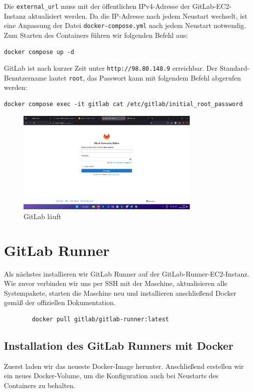 \documentclass[a4paper,12pt]{article}
\begin{document}
Die \texttt{external\_url} muss mit der öffentlichen IPv4-Adresse der GitLab-EC2-Instanz aktualisiert werden. Da die IP-Adresse nach jedem Neustart wechselt, ist eine Anpassung der Datei \texttt{docker-compose.yml} nach jedem Neustart notwendig.
Zum Starten des Containers führen wir folgenden Befehl aus:

\begin{verbatim}
docker compose up -d
\end{verbatim}

GitLab ist nach kurzer Zeit unter \texttt{http://98.80.148.9} erreichbar. Der Standard-Benutzername lautet \texttt{root}, das Passwort kann mit folgendem Befehl abgerufen werden:

\begin{verbatim}
docker compose exec -it gitlab cat /etc/gitlab/initial_root_password
\end{verbatim}

\begin{figure}[H]
	\centering
	\includegraphics[width=0.8\textwidth]{data/GITLAB_GEHT.png}
	\caption{GitLab läuft}
	\label{fig:GitLab läuft}
\end{figure}

\newpage


\section{GitLab Runner}
Als nächstes installieren wir GitLab Runner auf der GitLab-Runner-EC2-Instanz.  
Wie zuvor verbinden wir uns per SSH mit der Maschine, aktualisieren alle Systempakete, starten die Maschine neu und installieren anschließend Docker gemäß der offiziellen Dokumentation.

\begin{verbatim}
    	docker pull gitlab/gitlab-runner:latest
\end{verbatim}

\subsection{Installation des GitLab Runners mit Docker}
Zuerst laden wir das neueste Docker-Image herunter.  
Anschließend erstellen wir ein neues Docker-Volume, um die Konfiguration auch bei Neustarts des Containers zu behalten.
\end{document}

